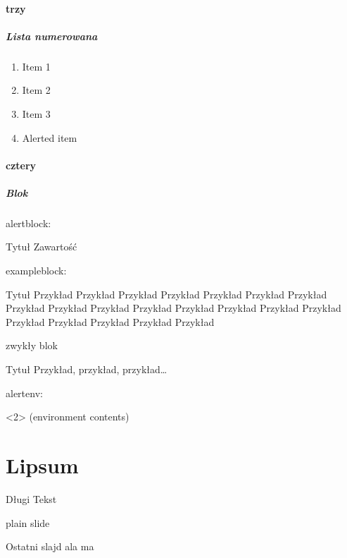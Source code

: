 \documentclass[lualatex,aspectratio=54,12pt,]{beamer}
\begin{document}
\subsection{trzy}

\begin{frame}
 \frametitle{Lista numerowana}
 \begin{enumerate}
  \item
        Item 1
  \item
        Item 2
  \item
        Item 3
  \item
        \alert{Alerted item}
 \end{enumerate}
\end{frame}

\subsection{cztery}

\begin{frame}
 \frametitle{Blok}
 alertblock:
 \begin{alertblock}{Tytuł}
  Zawartość
 \end{alertblock}

 exampleblock:
 \begin{exampleblock}{Tytuł}
  Przykład Przykład Przykład Przykład Przykład Przykład Przykład Przykład Przykład Przykład Przykład Przykład Przykład Przykład Przykład Przykład Przykład Przykład Przykład Przykład
 \end{exampleblock}

 zwykły blok
 \begin{block}{Tytuł}
 Przykład, przykład, przykład…
 \end{block}

 alertenv:
 \begin{alertenv}<2>
  (environment contents)
 \end{alertenv}
\end{frame}

\part{Lipsum}

\begin{frame}
\partpage
\end{frame}

\begin{frame}[allowframebreaks=0.97]{Długi Tekst}
 \lipsum
\end{frame}

\begin{frame}[plain,c]
plain slide
\end{frame}

\begin{frame}{Ostatni slajd}
ala ma 
\end{frame}
\end{document}

